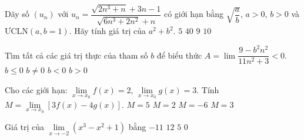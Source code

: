 \begin{ex}%
	Dãy số $(u_n)$ với $u_n=\dfrac{\sqrt{2n^3+n}+3n-1}{\sqrt{6n^3+2n^2}+n}$ có giới hạn bằng $\sqrt{\dfrac{a}{b}}$, $a>0$, $b>0$ và $\text{ƯCLN}(a,b=1)$. Hãy tính giá trị của $a^2+b^2$.
	\choice
	{$5$}
	{$40$}
	{$9$}
	{\True $10$}
\end{ex}

\begin{ex}%
	Tìm tất cả các giá trị thực của tham số $b$ để biểu thức $A=\lim\limits\dfrac{9-b^2n^2}{11n^2+3}<0$.
	\choice
	{$b\le 0$}
	{\True $b\ne 0$}
	{$b<0$}
	{$b>0$}
\end{ex}

\begin{ex}%
	Cho các giới hạn: $\lim \limits_{x\rightarrow x_0}f(x)=2$, $\lim \limits_{x\rightarrow x_0}g(x)=3$. Tính $M=\lim \limits_{x\rightarrow x_0}[3f(x)-4g(x)]$.
	\choice
	{$M=5$}
	{$M=2$}
	{\True $M=-6$}
	{$M=3$}
\end{ex}

\begin{ex}%
	Giá trị của $\lim\limits_{x\rightarrow -2} \left(x^3-x^2+1\right)$ bằng
	\choice
	{\True $-11$}
	{$12$}
	{$5$}
	{$0$}
\end{ex}


